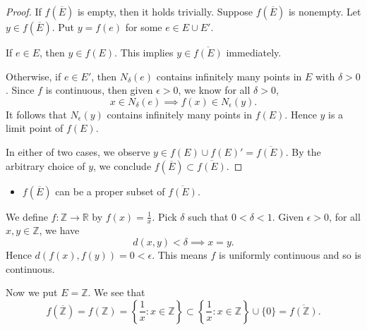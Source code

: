 \begin{Exercise}
\begin{proof}
If $f(\overline{E})$ is empty, then it holds trivially. Suppose $f(\overline{E})$ is nonempty. Let $y\in f(\overline{E})$. Put $y=f(e)$ for some $e\in E\cup E'$.

If $e\in E$, then $y\in f(E)$. This implies $y\in\overline{f(E)}$ immediately.

Otherwise, if $e\in E'$, then $N_{\delta}(e)$ contains infinitely many points in $E$ with $\delta>0$. Since $f$ is continuous, then given $\epsilon>0$, we know for all $\delta>0$,
$$
x\in N_{\delta}(e) \implies f(x)\in N_{\epsilon}(y).
$$
It follows that $N_{\epsilon}(y)$ contains infinitely many points in $f(E)$. Hence $y$ is a limit point of $f(E)$.

In either of two cases, we observe $y\in f(E)\cup f(E)' = \overline{f(E)}$. By the arbitrary choice of $y$, we conclude $f(\overline{E})\subset \overline{f(E)}$.
\end{proof}

\begin{itemize}
\item $f(\overline{E})$ can be a proper subset of $\overline{f(E)}$.
\end{itemize}
\begin{solution}
We define $f:\mathbb{Z}\to\mathbb{R}$ by $f(x) = \frac{1}{x}$. Pick $\delta$ such that $0 < \delta < 1$. Given $\epsilon>0$, for all $x,y\in \mathbb{Z}$, we have
$$
d(x,y)< \delta \implies x = y.
$$
Hence $d(f(x),f(y)) = 0 < \epsilon$. This means $f$ is uniformly continuous and so is continuous.

Now we put $E = \mathbb{Z}$. We see that
$$
f(\overline{\mathbb{Z}}) 
= f(\mathbb{Z}) 
= \left\{ \frac{1}{x} : x\in\mathbb{Z} \right\}
\subset \left\{ \frac{1}{x} : x\in\mathbb{Z} \right\} \cup \{0\}
= \overline{f(\mathbb{Z})}.
$$
\end{solution}
\end{Exercise}